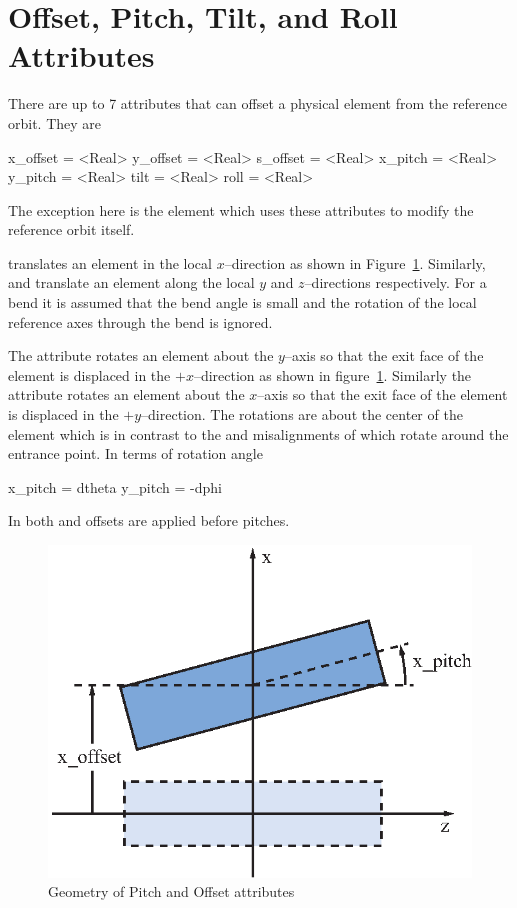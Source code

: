 \section{Offset, Pitch, Tilt, and Roll Attributes}
\label{s:offset}

There are up to 7 attributes that can offset a physical element
from the reference orbit. They are
\begin{example}
  x_offset = <Real>
  y_offset = <Real>
  s_offset = <Real>
  x_pitch  = <Real>
  y_pitch  = <Real>
  tilt     = <Real>
  roll     = <Real>
\end{example}
The exception here is the  element which uses these
attributes to modify the reference orbit itself.

 translates an element in the local $x$--direction
as shown in Figure~\ref{f:pitch}. Similarly,  and 
 translate an element along the local $y$ and 
$z$--directions respectively. For a bend it is assumed that
the bend angle is small and the rotation of the local reference
axes through the bend is ignored.

The  attribute rotates an element about the $y$--axis so
that the exit face of the element is displaced in the $+x$--direction
as shown in figure~\ref{f:pitch}. Similarly the  attribute
rotates an element about the $x$--axis so that the exit face of the
element is displaced in the $+y$--direction. The rotations are about
the center of the element which is in contrast to the  and
 misalignments of \mad which rotate around the entrance
point. In terms of rotation angle
\begin{example}
  x_pitch =  dtheta
  y_pitch = -dphi
\end{example}
In both \bmad and \mad offsets are applied before pitches.
\begin{figure}[ht]
  \centering
  \includegraphics{pitch.eps}
  \caption{Geometry of Pitch and Offset attributes}
  \label{f:pitch}
\end{figure}

